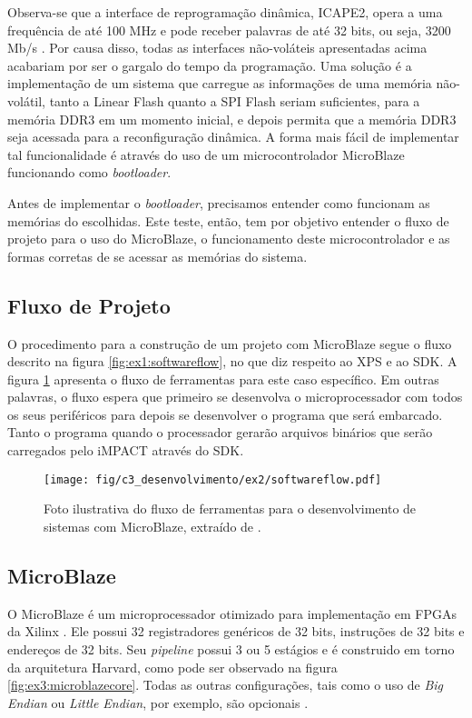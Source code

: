 \documentclass[11pt,a4paper,oneside]{book}
\begin{document}
Observa-se que a interface de reprogramação dinâmica, ICAPE2, opera a uma frequência de até 100 MHz e pode receber palavras de até 32 bits, ou seja, 3200 Mb/s \cite{ug702}.
Por causa disso, todas as interfaces não-voláteis apresentadas acima acabariam por ser o gargalo do tempo da programação.
Uma solução é a implementação de um sistema que carregue as informações de uma memória não-volátil, tanto a Linear Flash quanto a SPI Flash seriam suficientes, para a memória DDR3 em um momento inicial, e depois permita que a memória DDR3 seja acessada para a reconfiguração dinâmica.
A forma mais fácil de implementar tal funcionalidade é através do uso de um microcontrolador MicroBlaze funcionando como \textit{bootloader}.

Antes de implementar o \textit{bootloader}, precisamos entender como funcionam as memórias do escolhidas.
Este teste, então, tem por objetivo entender o fluxo de projeto para o uso do MicroBlaze, o funcionamento deste microcontrolador e as formas corretas de se acessar as memórias do sistema.

\subsection{Fluxo de Projeto}
O procedimento para a construção de um projeto com MicroBlaze segue o fluxo descrito na figura \ref{fig:ex1:softwareflow}, no que diz respeito ao XPS e ao SDK.
A figura \ref{fig:ex2:softwareflow} apresenta o fluxo de ferramentas para este caso específico.
Em outras palavras, o fluxo espera que primeiro se desenvolva o microprocessador com todos os seus periféricos para depois se desenvolver o programa que será embarcado.
Tanto o programa quando o processador gerarão arquivos binários que serão carregados pelo iMPACT através do SDK.

\begin{figure}[htp]
\centering
\texttt{[image: fig/c3\_desenvolvimento/ex2/softwareflow.pdf]}
\caption{Foto ilustrativa do fluxo de ferramentas para o desenvolvimento de sistemas com MicroBlaze, extraído de \cite{ug081}.}
\label{fig:ex2:softwareflow}
\end{figure}

\subsection{MicroBlaze}
O MicroBlaze é um microprocessador otimizado para implementação em FPGAs da Xilinx \cite{ug081}.
Ele possui 32 registradores genéricos de 32 bits, instruções de 32 bits e endereços de 32 bits.
Seu \textit{pipeline} possui 3 ou 5 estágios e é construido em torno da arquitetura Harvard, como pode ser observado na figura \ref{fig:ex3:microblazecore}.
Todas as outras configurações, tais como o uso de \textit{Big Endian} ou \textit{Little Endian}, por exemplo, são opcionais \cite{ug081}.
\end{document}
